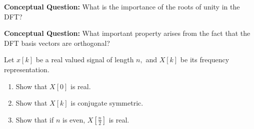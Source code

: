 
\begin{enumerate}

\qitem \textbf{Conceptual Question:} What is the importance of the roots of unity in the DFT?

\qitem \textbf{Conceptual Question:} What important property arises from the fact that the DFT basis vectors are orthogonal?


\qitem Let $x[k]$ be a real valued signal of length $n,$ and $X[k]$ be its frequency representation.
	\begin{enumerate}
		\item Show that $X[0]$ is real.
		\item Show that $X[k]$ is conjugate symmetric.
		\item Show that if $n$ is even, $X[\frac{n}{2}]$ is real.
	\end{enumerate}

\end{enumerate}
